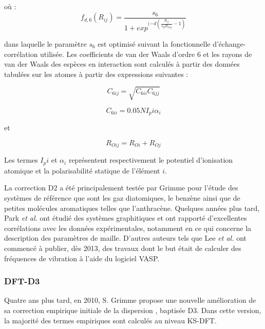 \documentclass[12pt,a4paper]{book}
\begin{document}
{	\noindent où :
	\begin{equation}
	f_{d,6} (R_{ij})= \frac{s_{6}}{1+exp^{(-d(\frac{R_{ij}}{s_{R}R_{Oij}}-1)}}  
	\end{equation}
	
	dans laquelle le paramètre $s_{6}$ est optimisé suivant la fonctionnelle d’échange-corrélation utilisée. Les coefficients de van der Waals d’ordre 6 et les rayons de van der Waals des espèces en interaction sont calculés à partir des données tabulées sur les atomes à partir des expressions suivantes :
	
	\begin{equation}
	C_{6ij} =\sqrt{C_{6ii}C_{6jj}}  
	\end{equation}
	
	\begin{equation}
	C_{6ii} = 0.05NI_{p}{i} \alpha_{i}
	\end{equation}
	
	et 
	
	\begin{equation}
	R_{Oij} = R_{Oi} + R_{Oj}
	\end{equation}
	
	Les termes $I_{p}{i}$ et $\alpha_{i}$ représentent respectivement le potentiel d’ionisation atomique et la polarisabilité statique de l’élément $i$.
	
	La correction D2 a été principalement testée par Grimme \cite{grimme2006semiempirical} pour l’étude des systèmes de référence que sont les gaz diatomiques, le benzène ainsi que de petites molécules aromatiques telles que l’anthracène. Quelques années plus tard, Park \textit{et al.} \cite{park2011ab} ont étudié des systèmes graphitiques et ont rapporté d’excellentes corrélations avec les données expérimentales, notamment en ce qui concerne la description des paramètres de maille. D’autres auteurs tels que Lee \textit{et al.} \cite{lee2013sum} ont commencé à publier, dès 2013, des travaux dont le but était de calculer des fréquences de vibration à l’aide du logiciel VASP.
	
	\subsubsection{DFT-D3}
	
	Quatre ans plus tard, en 2010, S. Grimme \cite{grimme2006semiempirical} propose une nouvelle amélioration de sa correction empirique initiale de la dispersion \cite{grimme2004accurate}, baptisée D3. Dans cette version, la majorité des termes empiriques sont calculés au niveau KS-DFT.
	
}
\end{document}
